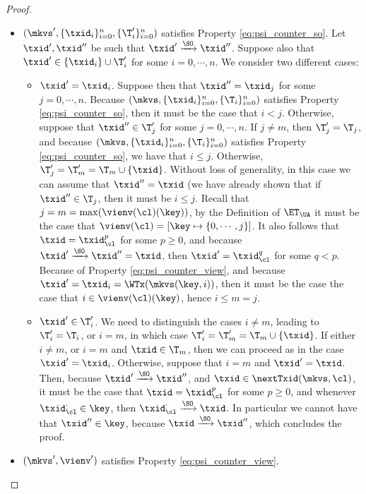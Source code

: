 \begin{proof}
\begin{itemize}
\begin{itemize}
\item $(\mkvs',  \{\txid_{i}\}_{i=0}^{n}, \{\T'_{i}\}_{i=0}^{n})$ satisfies Property \eqref{eq:psi_counter_so}. 
Let $\txid', \txid''$ be such that $\txid' \xrightarrow{\SO} \txid''$. 
Suppose also that $\txid' \in \{\txid_{i}\} \cup \T'_{i}$ for some $i = 0,\cdots, n$. We consider two different cases:
\begin{itemize}
\item $\txid' = \txid_{i}$. Suppose then that $\txid'' = \txid_{j}$ for some $j = 0, \cdots, n$. Because 
$(\mkvs,  \{\txid_{i}\}_{i=0}^{n}, \{\T_{i}\}_{i=0}^{n})$ satisfies Property 
\eqref{eq:psi_counter_so}, then it must be the case that $i < j$. Otherwise, 
suppose that $\txid'' \in \T'_{j}$ for some $j=0,\cdots,n$. If $j \neq m$, then $\T'_{j} = \T_{j}$, 
and because $(\mkvs,  \{\txid_{i}\}_{i=0}^{n}, \{\T_{i}\}_{i=0}^{n})$ satisfies Property \eqref{eq:psi_counter_so}, we have that $i \leq j$. 
Otherwise, $\T'_{j} = \T'_{m} =  \T_{m} \cup \{\txid\}$. Without loss of generality, in this case 
we can assume that $\txid'' = \txid$ (we have already shown that if $\txid'' \in \T_{j}$, then 
it must be $i \leq j$. Recall that $j = m = \max(\vienv(\cl)(\key))$, by the Definition of 
$\ET_{\UA}$ it must be the case that $\vienv(\cl) = [\key \mapsto \{0,\cdots, j\}]$. 
It also follows that $\txid = \txid_{\cl}^{p}$ for some $p \geq 0$, and because $\txid' \xrightarrow{\SO} \txid'' = \txid$, 
then $\txid' = \txid_{\cl}^{q}$ for some $q < p$. Because of Property 
\eqref{eq:psi_counter_view}, and because $\txid' = \txid_{i} = \WTx(\mkvs(\key, i))$, then it must be the case the 
case that $i \in \vienv(\cl)(\key)$, hence  $i \leq m = j$.

\item $\txid' \in \T'_{i}$. We need to distinguish the cases $i \neq m$, leading to $\T'_{i} = \T_{i}$, 
or $i = m$, in which case $\T'_{i} = \T'_{m} = \T_{m} \cup \{\txid\}$. If either $i \neq m$, or $i = m$ and $\txid \in 
\T_{m}$, then we can proceed as in the case $\txid' = \txid_{i}$. Otherwise, suppose that $i = m$ and 
$\txid' = \txid$. Then, because $\txid' \xrightarrow{\SO} \txid''$, and $\txid \in \nextTxid(\mkvs,\cl)$, 
it must be the case that $\txid = \txid_{\cl}^{p}$ for some $p \geq 0$, and whenever 
$\txid_{\cl}^{\cdot} \in \key$, then $\txid_{\cl}^{\cdot} \xrightarrow{\SO} \txid$. In particular 
we cannot have that $\txid'' \in \key$, because $\txid \xrightarrow{\SO} \txid''$, which 
concludes the proof.
\end{itemize}

\item $(\mkvs', \vienv')$ satisfies Property \eqref{eq:psi_counter_view}.

\end{itemize}

\end{itemize}

\end{proof}

